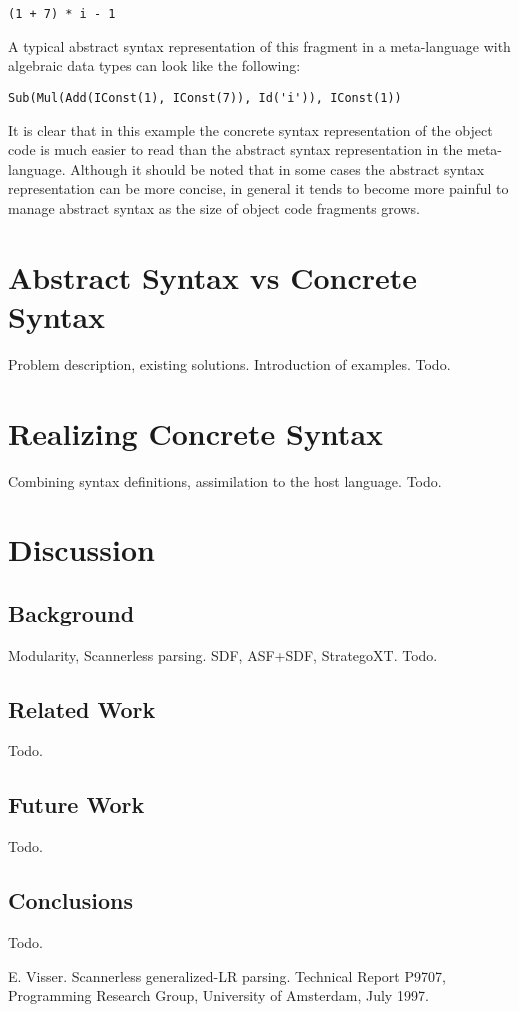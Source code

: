 \documentclass[a4paper,11pt]{article}
\begin{document}
\begin{lstlisting}[title=Example expression in concrete syntax]
(1 + 7) * i - 1
\end{lstlisting}

A typical abstract syntax representation of this fragment in a meta-language
with algebraic data types can look like the following:

\begin{lstlisting}[title=Example expression in abstract syntax]
Sub(Mul(Add(IConst(1), IConst(7)), Id('i')), IConst(1))
\end{lstlisting}

It is clear that in this example the concrete syntax representation of the
object code is much easier to read than the abstract syntax representation in
the meta-language. Although it should be noted that in some cases the abstract
syntax representation can be more concise, in general it tends to become more
painful to manage abstract syntax as the size of object code fragments grows.


\section{Abstract Syntax vs Concrete Syntax}

Problem description, existing solutions.
Introduction of examples.
Todo.


\section{Realizing Concrete Syntax}

Combining syntax definitions, assimilation to the host language.
Todo.


\section{Discussion}


\subsection{Background}

Modularity, Scannerless parsing.
SDF, ASF+SDF, StrategoXT.
Todo.


\subsection{Related Work}

Todo.


\subsection{Future Work}

Todo.


\subsection{Conclusions}

Todo.


\begin{thebibliography}{99}

E. Visser. Scannerless generalized-LR parsing.
Technical Report P9707, Programming Research Group, University of Amsterdam, July 1997.

\end{thebibliography}
\end{document}
